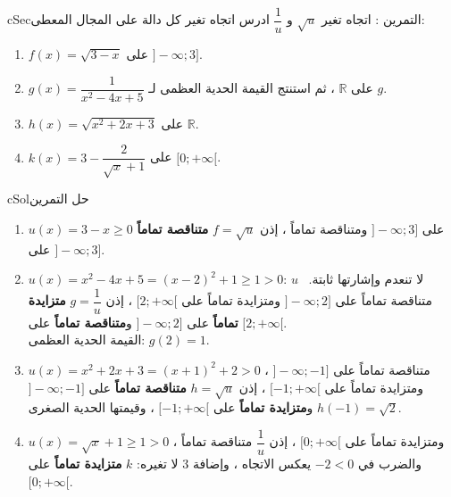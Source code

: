 \documentclass[12pt,a4paper]{article}
\newenvironment{BOX}[2]{\begin{otherlanguage}{english}\begin{arbox}{#1}{#2}}{\end{arbox}\end{otherlanguage}}
\newcounter{exo}
\newenvironment{tamrin}[1]{\stepcounter{exo}\begin{BOX}{cSec}{التمرين \theexo: #1}}{\end{BOX}}
\newenvironment{hal}{\Needspace{12\baselineskip}\begin{otherlanguage}{english}\begin{arbox}[breakable]{cSol}{حل التمرين \theexo}}{\end{arbox}\end{otherlanguage}}
\newcommand{\R}{\mathbb{R}}
\begin{document}
\begin{tamrin}{اتجاه تغير $\sqrt u$ و $\dfrac1u$}
ادرس اتجاه تغير كل دالة على المجال المعطى:
\begin{enumerate}
\item $f(x)=\sqrt{3-x}$ على $]-\infty;3]$.
\item $g(x)=\dfrac{1}{x^2-4x+5}$ على $\R$ ، ثم استنتج القيمة الحدية العظمى لـ $g$.
\item $h(x)=\sqrt{x^2+2x+3}$ على $\R$.
\item $k(x)=3-\dfrac{2}{\sqrt x+1}$ على $[0;+\infty[$.
\end{enumerate}
\end{tamrin}
\begin{hal}
\begin{enumerate}
\item $u(x)=3-x\ge0$ على $]-\infty;3]$ ومتناقصة تماماً ، إذن $f=\sqrt u$ \textbf{متناقصة تماماً} على $]-\infty;3]$.
\item $u(x)=x^2-4x+5=(x-2)^2+1\ge1>0$: لا تنعدم وإشارتها ثابتة. \ $u$ متناقصة تماماً على $]-\infty;2]$ ومتزايدة تماماً على $[2;+\infty[$ ، إذن $g=\dfrac1u$ \textbf{متزايدة تماماً} على $]-\infty;2]$ و\textbf{متناقصة تماماً} على $[2;+\infty[$.\\
القيمة الحدية العظمى: $\boxed{g(2)=1}$.
\item $u(x)=x^2+2x+3=(x+1)^2+2>0$ ، متناقصة تماماً على $]-\infty;-1]$ ومتزايدة تماماً على $[-1;+\infty[$ ، إذن $h=\sqrt u$ \textbf{متناقصة تماماً} على $]-\infty;-1]$ و\textbf{متزايدة تماماً} على $[-1;+\infty[$ ، وقيمتها الحدية الصغرى $h(-1)=\sqrt2$.
\item $u(x)=\sqrt x+1\ge1>0$ ومتزايدة تماماً على $[0;+\infty[$ ، إذن $\dfrac1u$ متناقصة تماماً ، والضرب في $-2<0$ يعكس الاتجاه ، وإضافة $3$ لا تغيره: $k$ \textbf{متزايدة تماماً} على $[0;+\infty[$.
\end{enumerate}
\end{hal}

\end{document}
